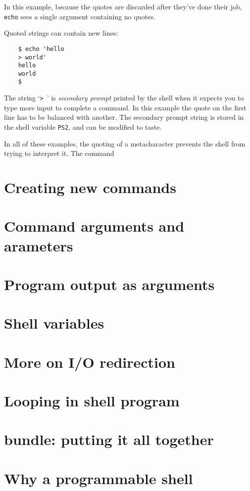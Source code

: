 In this example, because the quotes are discarded after they've done their
job, \texttt{echo} sees a single argument containing no quotes.

    Quoted strings can contain new lines:
\begin{verbatim}
    $ echo 'hello
    > world'
    hello
    world
    $
\end{verbatim}
The string `\verb=> =' is \emph{secondary prompt} printed by the shell when it expects you 
to type more input to complete a command. In this example the quote on the
first line has to be balanced with another. The secondary prompt string is stored in the shell variable \texttt{PS2}, and can be modified to taste.

    In all of these examples, the quoting of a metacharacter prevents the shell
from trying to interpret it. The command


\section{Creating new commands}
\section{Command arguments and arameters}
\section{Program output as arguments}
\section{Shell variables}
\section{More on I/O redirection}
\section{Looping in shell program}
\section{bundle: putting it all together}
\section{Why a programmable shell}

